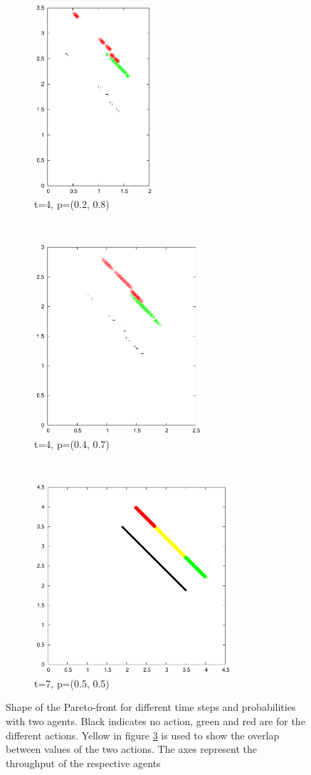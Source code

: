 \documentclass{article}
\begin{document}
\begin{figure}
		\begin{subfigure}[b]{0.30\textwidth}
			\centering
			\includegraphics[width=\textwidth,height=7cm,keepaspectratio]{images/t4_28}
			\caption{t=4, p=(0.2, 0.8)}
			\label{fig:t4_28}
		\end{subfigure}
		~
		\begin{subfigure}[b]{0.30\textwidth}
			\centering
			\includegraphics[width=\textwidth,height=7cm,keepaspectratio]{images/t4_47}
			\caption{t=4, p=(0.4, 0.7)}
			\label{fig:t4_47}
		\end{subfigure}
		~
		\begin{subfigure}[b]{0.30\textwidth}
			\centering
			\includegraphics[width=\textwidth,height=7cm,keepaspectratio]{images/t7_55}
			\caption{t=7, p=(0.5, 0.5)}
			\label{fig:t7_55}
		\end{subfigure}
		\caption{Shape of the Pareto-front for different time steps and
			probabilities with two agents. Black indicates no action, green and
			red are for the different actions. Yellow in figure \ref{fig:t7_55} is
			used to show the overlap between values of the two actions. The axes
			represent the throughput of the respective agents}
		\label{fig:many_fronts}
	\end{figure}
\end{document}
